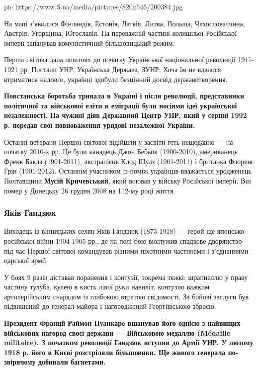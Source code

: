 \ifcmt
pic https://www.5.ua/media/pictures/820x546/200384.jpg
\fi

На мапі з'явилися Фінляндія, Естонія, Латвія, Литва, Польща,
Чехословаччина, Австрія, Угорщина, Югославія. На переважній частині
колишньої Російської імперії запанував комуністичний більшовицький режим. 

Перша світова дала поштовх до початку Української національної революції
1917-1921 рр. Постали УНР, Українська Держава, ЗУНР. Хоча їм не вдалося
втриматися надовго, українці здобули безцінний досвід державотворення.

\begin{leftbar}
	\bfseries
Повстанська боротьба тривала в Україні і після революції, представники
політичної та військової еліти в еміграції були носіями ідеї української
незалежності. На чужині діяв Державний Центр УНР, який у серпні 1992 р.
передав свої повноваження урядові незалежної України.
\end{leftbar}

Останні ветерани Першої світової відійшли у засвіти геть нещодавно --- на
початку 2010-х рр. Це були канадець Джон Бебкок (1900-2010), американець
Френк Баклз (1901-2011), австралієць Клод Шулз (1901-2011) і британка
Флоренс Грін (1901-2012). Останнім учасником із-поміж українців вважається
уродженець Полтавщини \textbf{Мусій Кричевський}, який воював у війську Російської
імперії. Він помер у Донецьку 26 грудня 2008 на 112-му році життя.

\subsubsection{Яків Гандзюк}

Виходець із вінницьких селян Яків Гандзюк (1873-1918) --- герой ще
японсько-російської війни 1904-1905 рр., де на полі бою вислужив спадкове
дворянство --- під час Першої світової командував різними піхотними
частинами і з'єднаннями царської армії.

У боях 9 разів діставав поранення і контузії, зокрема тяжкі: шрапнеллю у
праву частину тулуба, кулею в кисть лівої руки навиліт, контузію важким
артилерійським снарядом із глибокою втратою свідомості. За бойові заслуги
був підвищений до генерал-майора і нагороджений Георгіївською зброєю.

\begin{leftbar}
	\bfseries
Президент Франції Раймон Пуанкаре вшанував його однією з найвищих
військових нагород своєї держави --- Військовою медаллю (Médaille
militaire). З початком революції Гандзюк вступив до Армії УНР. У лютому
1918 р. його в Києві розстріляли більшовики. Ще живого генерала
по-звірячому добивали багнетами.
\end{leftbar}


